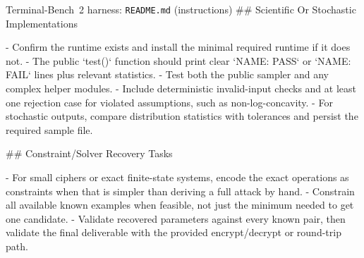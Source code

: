 \begin{promptbox}{Terminal-Bench~2 harness: \texttt{README.md} (instructions)}
## Scientific Or Stochastic Implementations

- Confirm the runtime exists and install the minimal required runtime if it does not.
- The public `test()` function should print clear `NAME: PASS` or `NAME: FAIL` lines plus relevant statistics.
- Test both the public sampler and any complex helper modules.
- Include deterministic invalid-input checks and at least one rejection case for violated assumptions, such as non-log-concavity.
- For stochastic outputs, compare distribution statistics with tolerances and persist the required sample file.

## Constraint/Solver Recovery Tasks

- For small ciphers or exact finite-state systems, encode the exact operations as constraints when that is simpler than deriving a full attack by hand.
- Constrain all available known examples when feasible, not just the minimum needed to get one candidate.
- Validate recovered parameters against every known pair, then validate the final deliverable with the provided encrypt/decrypt or round-trip path.
\end{promptbox}

